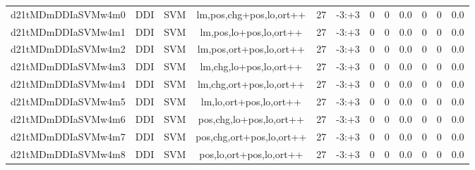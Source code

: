 \documentclass[a4paper]{article}
\begin{document}
\begin{landscape}
\begin{center}
\begin{tabular}{ |c|c|c|c|c|c|c|c|c|c|c|c|}
 
 	
 	\small{ d21tMDmDDIaSVMw4m0 } & \small{ DDI} & \small{  SVM }  & lm,pos,chg+pos,lo,ort++  &  27 &  \small{  -3:+3 }  &  0 & 0 & 0.0  &  0 & 0 & 0.0 \\
 	

 
 	
 	\small{ d21tMDmDDIaSVMw4m1 } & \small{ DDI} & \small{  SVM }  & lm,pos,lo+pos,lo,ort++  &  27 &  \small{  -3:+3 }  &  0 & 0 & 0.0  &  0 & 0 & 0.0 \\
 	

 
 	
 	\small{ d21tMDmDDIaSVMw4m2 } & \small{ DDI} & \small{  SVM }  & lm,pos,ort+pos,lo,ort++  &  27 &  \small{  -3:+3 }  &  0 & 0 & 0.0  &  0 & 0 & 0.0 \\
 	

 
 	
 	\small{ d21tMDmDDIaSVMw4m3 } & \small{ DDI} & \small{  SVM }  & lm,chg,lo+pos,lo,ort++  &  27 &  \small{  -3:+3 }  &  0 & 0 & 0.0  &  0 & 0 & 0.0 \\
 	

 
 	
 	\small{ d21tMDmDDIaSVMw4m4 } & \small{ DDI} & \small{  SVM }  & lm,chg,ort+pos,lo,ort++  &  27 &  \small{  -3:+3 }  &  0 & 0 & 0.0  &  0 & 0 & 0.0 \\
 	

 
 	
 	\small{ d21tMDmDDIaSVMw4m5 } & \small{ DDI} & \small{  SVM }  & lm,lo,ort+pos,lo,ort++  &  27 &  \small{  -3:+3 }  &  0 & 0 & 0.0  &  0 & 0 & 0.0 \\
 	

 
 	
 	\small{ d21tMDmDDIaSVMw4m6 } & \small{ DDI} & \small{  SVM }  & pos,chg,lo+pos,lo,ort++  &  27 &  \small{  -3:+3 }  &  0 & 0 & 0.0  &  0 & 0 & 0.0 \\
 	

 
 	
 	\small{ d21tMDmDDIaSVMw4m7 } & \small{ DDI} & \small{  SVM }  & pos,chg,ort+pos,lo,ort++  &  27 &  \small{  -3:+3 }  &  0 & 0 & 0.0  &  0 & 0 & 0.0 \\
 	

 
 	
 	\small{ d21tMDmDDIaSVMw4m8 } & \small{ DDI} & \small{  SVM }  & pos,lo,ort+pos,lo,ort++  &  27 &  \small{  -3:+3 }  &  0 & 0 & 0.0  &  0 & 0 & 0.0 \\
 	
 \hline
\end{tabular}
\end{center}





\end{landscape}
\end{document}
